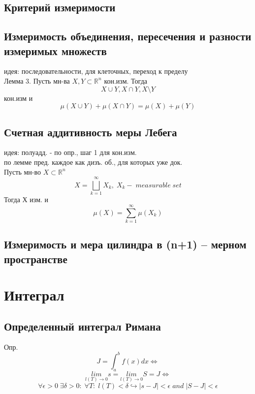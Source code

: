 \documentclass{article}
\begin{document}
\subsection{Критерий измеримости}
\subsection{Измеримость объединения, пересечения и разности измеримых множеств}
идея: последовательности, для клеточных, переход к пределу \\
Лемма 3. Пусть мн-ва $X,Y \subset \mathbb R^n$ кон.изм. Тогда
\begin{equation*}
    X \cup Y, X \cap Y, X \setminus Y
\end{equation*}
кон.изм и
\begin{equation*}
    \mu (X \cup Y) + \mu (X \cap Y) = \mu (X) + \mu (Y)
\end{equation*}
\subsection{Счетная аддитивность меры Лебега}
идея: полуадд. - по опр., шаг 1 для кон.изм.\\
по лемме пред. каждое как дизъ. об., для которых уже док. \\
Пусть мн-во $X \subset \mathbb R^n$
\begin{equation*}
    X = \bigsqcup_{k=1}^{\infty} X_k, \; X_k - \; measurable \; set
\end{equation*}
Тогда Х изм. и
\begin{equation*}
    \mu (X) = \sum_{k=1}^\infty \mu ( X_k )
\end{equation*}
\subsection{Измеримость и мера цилиндра в (n+1) – мерном пространстве}


\newpage
\section{Интеграл}
\subsection{Определенный интеграл Римана}
Опр.
\begin{equation*}
    J = \int_a^b f(x) dx \Leftrightarrow
\end{equation*}
\begin{equation*}
    \underset{l(T) \rightarrow 0}{lim} s = \underset{l(T) \rightarrow 0}{lim} S = J \Leftrightarrow
\end{equation*}
\begin{equation*}
    \forall \epsilon >0 \; \exists \delta > 0: \; \forall T: \; l(T)<\delta \hookrightarrow |s-J|<\epsilon \; and \; |S-J|<\epsilon
\end{equation*}
\end{document}
